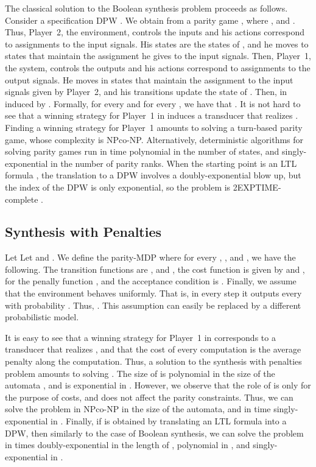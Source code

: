 \documentclass[runningheads,a4paper]{llncs}
\newcommand{\DPW}{\mbox{\rm DPW}\xspace}
\begin{document}
The classical solution to the Boolean synthesis problem proceeds as follows. Consider a specification \DPW
 . We obtain from  a parity game
  , where , and . Thus, Player~2, the environment, controls the inputs and his actions correspond to assignments to the input signals. His states are the states of , and he moves to states that maintain the assignment he gives to the input signals. Then, Player~1, the system, controls the outputs and his actions correspond to assignments to the output signals. He moves in states that maintain the assignment to the input signals given by Player~2, and his transitions update the state of . Then,  in induced by . Formally, for every  and for every , we have that . It is not hard to see that a winning strategy for Player~1 in  induces a transducer that realizes  \cite{PR89a}. 
Finding a winning strategy for Player~1 amounts to solving a turn-based parity game, whose complexity is NPco-NP. Alternatively, deterministic algorithms for solving parity games run in time polynomial in the number of states, and singly-exponential in the number of parity ranks. When the starting point is an LTL formula , the translation to a \DPW involves a doubly-exponential blow up, but the index of the \DPW is only exponential, so the problem is 2EXPTIME-complete \cite{Ros92}.
 

\subsection{Synthesis with Penalties}
\label{app penalties}

Let 
Let  and . We define the parity-MDP  where for every , , and , we have the following. The transition functions are , and , the cost function is given by  and , for the penally function , and the acceptance condition is . Finally, we assume that the environment behaves uniformly. That is, in every step it outputs every  with probability . Thus, . This assumption can easily be replaced by a different probabilistic model. 

It is easy to see that a winning strategy for Player~1 in  corresponds to a transducer that realizes , and that the cost of every computation is the average penalty along the computation. Thus, a solution to the synthesis with penalties problem amounts to solving . The size of  is polynomial in the size of the automata , and is exponential in . However, we observe that the role of  is only for the purpose of costs, and does not affect the parity constraints. Thus, we can solve the problem in NPco-NP in the size of the automata, and in time singly-exponential in .
Finally, if  is obtained by translating an LTL formula  into a DPW, then similarly to the case of Boolean synthesis, we can solve the problem in times doubly-exponential in the length of , polynomial in , and singly-exponential in .
\end{document}
